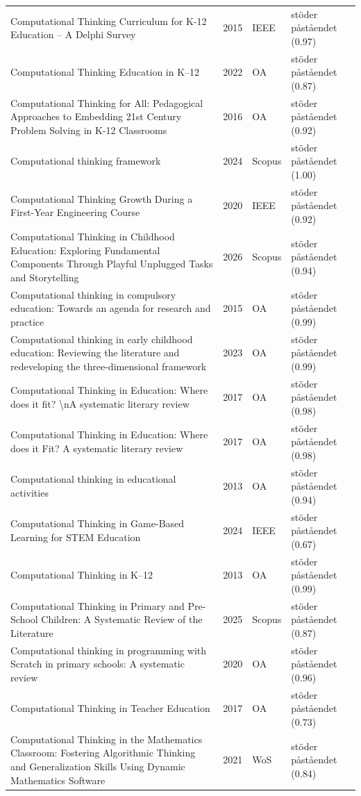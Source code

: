 \begin{longtable}{@{}%
  >{\raggedright\arraybackslash}p{}c%
  >{\raggedright\arraybackslash}p{}%
  >{\raggedright\arraybackslash}p{}@{}}
Computational Thinking Curriculum for K-12 Education -- A Delphi Survey & 2015 & IEEE & stöder påståendet (0.97) \\
Computational Thinking Education in K--12 & 2022 & OA & stöder påståendet (0.87) \\
Computational Thinking for All: Pedagogical Approaches to Embedding 21st Century Problem Solving in K-12 Classrooms & 2016 & OA & stöder påståendet (0.92) \\
Computational thinking framework & 2024 & Scopus & stöder påståendet (1.00) \\
Computational Thinking Growth During a First-Year Engineering Course & 2020 & IEEE & stöder påståendet (0.92) \\
Computational Thinking in Childhood Education: Exploring Fundamental Components Through Playful Unplugged Tasks and Storytelling & 2026 & Scopus & stöder påståendet (0.94) \\
Computational thinking in compulsory education: Towards an agenda for research and practice & 2015 & OA & stöder påståendet (0.99) \\
Computational thinking in early childhood education: Reviewing the literature and redeveloping the three-dimensional framework & 2023 & OA & stöder påståendet (0.99) \\
Computational Thinking in Education: Where does it fit? \textbackslash{}nA systematic literary review & 2017 & OA & stöder påståendet (0.98) \\
Computational Thinking in Education: Where does it Fit? A systematic literary review & 2017 & OA & stöder påståendet (0.98) \\
Computational thinking in educational activities & 2013 & OA & stöder påståendet (0.94) \\
Computational Thinking in Game-Based Learning for STEM Education & 2024 & IEEE & stöder påståendet (0.67) \\
Computational Thinking in K--12 & 2013 & OA & stöder påståendet (0.99) \\
Computational Thinking in Primary and Pre-School Children: A Systematic Review of the Literature & 2025 & Scopus & stöder påståendet (0.87) \\
Computational thinking in programming with Scratch in primary schools: A systematic review & 2020 & OA & stöder påståendet (0.96) \\
Computational Thinking in Teacher Education & 2017 & OA & stöder påståendet (0.73) \\
Computational Thinking in the Mathematics Classroom: Fostering Algorithmic Thinking and Generalization Skills Using Dynamic Mathematics Software & 2021 & WoS & stöder påståendet (0.84) \\

\end{longtable}
